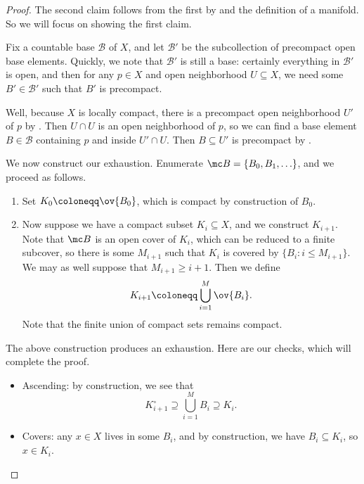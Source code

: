 \documentclass[../notes.tex]{subfiles}
\begin{document}
\begin{proof}
	The second claim follows from the first by  and the definition of a manifold. So we will focus on showing the first claim.

	Fix a countable base $\mathcal B$ of $X$, and let $\mathcal B'$ be the subcollection of precompact open base elements. Quickly, we note that $\mathcal B'$ is still a base: certainly everything in $\mathcal B'$ is open, and then for any $p\in X$ and open neighborhood $U\subseteq X$, we need some $B'\in\mathcal B'$ such that $B'$ is precompact.
	
	Well, because $X$ is locally compact, there is a precompact open neighborhood $U'$ of $p$ by . Then $U\cap U$ is an open neighborhood of $p$, so we can find a base element $B\in\mathcal B$ containing $p$ and inside $U'\cap U$. Then $B\subseteq U'$ is precompact by .

	We now construct our exhaustion. Enumerate $\mc B=\{B_0,B_1,\ldots\}$, and we proceed as follows.
	\begin{enumerate}
		\item Set $K_0\coloneqq\ov{B_0}$, which is compact by construction of $B_0$.
		\item Now suppose we have a compact subset $K_i\subseteq X$, and we construct $K_{i+1}$. Note that $\mc B$ is an open cover of $K_i$, which can be reduced to a finite subcover, so there is some $M_{i+1}$ such that $K_i$ is covered by $\{B_i:i\le M_{i+1}\}$. We may as well suppose that $M_{i+1}\ge i+1$. Then we define
		\[K_{i+1}\coloneqq\bigcup_{i=1}^M\ov{B_i}.\]
		Note that the finite union of compact sets remains compact.
	\end{enumerate}
	The above construction produces an exhaustion. Here are our checks, which will complete the proof.
	\begin{itemize}
		\item Ascending: by construction, we see that
		\[K_{i+1}^\circ\supseteq\bigcup_{i=1}^MB_i\supseteq K_i.\]
		\item Covers: any $x\in X$ lives in some $B_i$, and by construction, we have $B_i\subseteq K_i$, so $x\in K_i$.
		\qedhere
	\end{itemize}
\end{proof}
\end{document}
